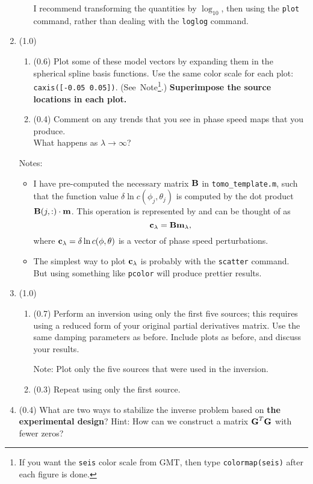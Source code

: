 \documentclass[11pt,titlepage,fleqn]{article}
\begin{document}
\begin{enumerate}
\begin{enumerate}
I recommend transforming the quantities by $\log_{10}$, then using the \verb+plot+ command, rather than dealing with the \verb+loglog+ command.

\end{enumerate}


\item (1.0) 

\begin{enumerate}
\item (0.6) Plot some of these model vectors by expanding them in the spherical spline basis functions. Use the same color scale for each plot: \verb+caxis([-0.05 0.05])+. (See~Note\footnote{If you want the {\tt seis} color scale from GMT, then type {\tt colormap(seis)} after each figure is done.}.) {\bf Superimpose the source locations in each plot.}

\item (0.4) Comment on any trends that you see in phase speed maps that you produce. \\
What happens as $\lambda \rightarrow \infty$?
\end{enumerate}

Notes:
%
\begin{itemize}
\item I have pre-computed the necessary matrix $\mbox{${\bf B}$}$ in \verb+tomo_template.m+, such that the function value $\delta\ln c(\phi_j, \theta_j)$ is computed by the dot product $\mbox{${\bf B}$}(j,:) \cdot \mbox{${\bf m}$}$. This operation is represented by  and can be thought of as
%
\begin{equation}
\mbox{${\bf c}$}_{\lambda} = \mbox{${\bf B}$} \mbox{${\bf m}$}_{\lambda},
\end{equation}
%
where $\mbox{${\bf c}$}_{\lambda} = \delta\ln c(\phi, \theta)$ is a vector of phase speed perturbations.

\item The simplest way to plot $\mbox{${\bf c}$}_{\lambda}$ is probably with the \verb+scatter+ command. \\ But using something like \verb+pcolor+ will produce prettier results.

\end{itemize}

\item (1.0)
%
\begin{enumerate}
\item (0.7) Perform an inversion using only the first five sources; this requires using a reduced form of your original partial derivatives matrix. Use the same damping parameters as before. Include plots as before, and discuss your results.

Note: Plot only the five sources that were used in the inversion.

\item (0.3) Repeat using only the first source.
\end{enumerate}

\item (0.4) What are two ways to stabilize the inverse problem based on {\bf the experimental design}? Hint: How can we construct a matrix $\mbox{${\bf G}$}^T\mbox{${\bf G}$}$ with fewer zeros?

\end{enumerate}
\end{document}
